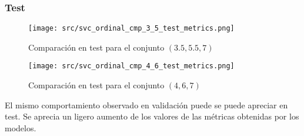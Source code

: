 \subsubsection*{Test}
\begin{figure}[H]
	\centering
	\texttt{[image: src/svc\_ordinal\_cmp\_3\_5\_test\_metrics.png]}
	\caption{Comparación en test para el conjunto  $(3.5,5.5,7)$}
	\label{fig:svc_ordin_test_cmp_1}
\end{figure}
\begin{figure}[H]
	\centering
	\texttt{[image: src/svc\_ordinal\_cmp\_4\_6\_test\_metrics.png]}
	\caption{Comparación en test para el conjunto  $(4,6,7)$}
	\label{fig:svc_ordin_test_cmp_2}
\end{figure}
El mismo comportamiento observado en validación puede se puede apreciar en test. Se aprecia un ligero aumento de los valores de las métricas obtenidas por los modelos. 
\clearpage
